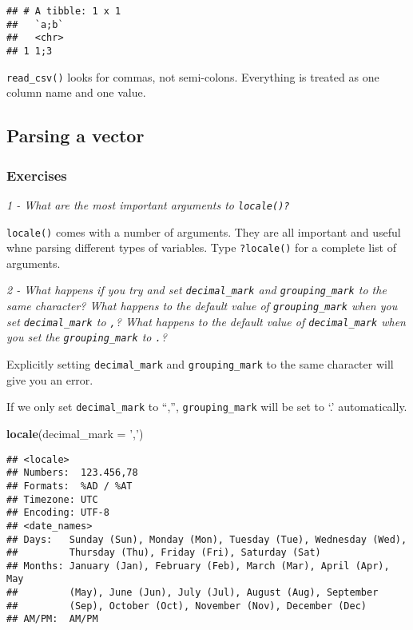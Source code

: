 \documentclass[]{article}
\newenvironment{Shaded}{\begin{snugshade}}{\end{snugshade}}
\newcommand{\KeywordTok}[1]{\textcolor[rgb]{0.13,0.29,0.53}{\textbf{#1}}}
\newcommand{\DataTypeTok}[1]{\textcolor[rgb]{0.13,0.29,0.53}{#1}}
\newcommand{\StringTok}[1]{\textcolor[rgb]{0.31,0.60,0.02}{#1}}
\newcommand{\NormalTok}[1]{#1}
\theoremstyle{definition}
\theoremstyle{definition}
\theoremstyle{definition}
\theoremstyle{remark}
\begin{document}
\begin{verbatim}
## # A tibble: 1 x 1
##   `a;b`
##   <chr>
## 1 1;3
\end{verbatim}

\texttt{read\_csv()} looks for commas, not semi-colons. Everything is
treated as one column name and one value.

\subsection{Parsing a vector}\label{parsing-a-vector}

\subsubsection{Exercises}\label{exercises-20}

\emph{1 - What are the most important arguments to \texttt{locale()?}}

\texttt{locale()} comes with a number of arguments. They are all
important and useful whne parsing different types of variables. Type
\texttt{?locale()} for a complete list of arguments.

\emph{2 - What happens if you try and set \texttt{decimal\_mark} and
\texttt{grouping\_mark} to the same character? What happens to the
default value of \texttt{grouping\_mark} when you set
\texttt{decimal\_mark} to \texttt{,}? What happens to the default value
of \texttt{decimal\_mark} when you set the \texttt{grouping\_mark} to
\texttt{.}?}

Explicitly setting \texttt{decimal\_mark} and \texttt{grouping\_mark} to
the same character will give you an error.

If we only set \texttt{decimal\_mark} to ``,'', \texttt{grouping\_mark}
will be set to `.' automatically.

\begin{Shaded}
\begin{Highlighting}[]
\KeywordTok{locale}\NormalTok{(}\DataTypeTok{decimal_mark =} \StringTok{','}\NormalTok{)}
\end{Highlighting}
\end{Shaded}

\begin{verbatim}
## <locale>
## Numbers:  123.456,78
## Formats:  %AD / %AT
## Timezone: UTC
## Encoding: UTF-8
## <date_names>
## Days:   Sunday (Sun), Monday (Mon), Tuesday (Tue), Wednesday (Wed),
##         Thursday (Thu), Friday (Fri), Saturday (Sat)
## Months: January (Jan), February (Feb), March (Mar), April (Apr), May
##         (May), June (Jun), July (Jul), August (Aug), September
##         (Sep), October (Oct), November (Nov), December (Dec)
## AM/PM:  AM/PM
\end{verbatim}
\end{document}
